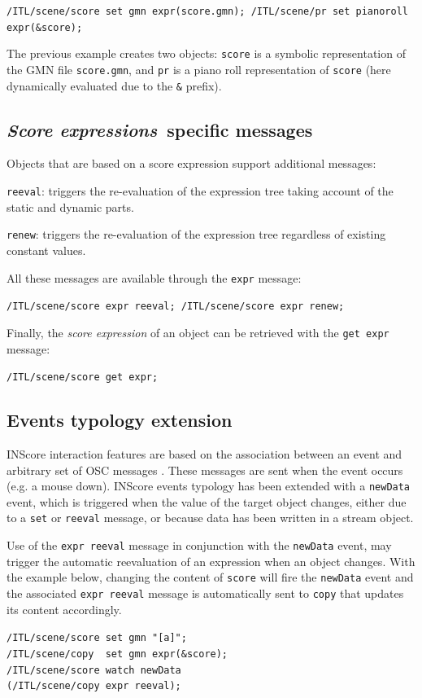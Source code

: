 \documentclass{article}
\newcommand{\OSC}[1]{{\fontsize{9.5pt}{10pt} \selectfont\texttt{#1}}}
\newcommand{\SExpr}{\emph{Score expressions}}
\let\olditemize\itemize
\let\oldenditemize\enditemize
\renewenvironment{itemize} 	{\olditemize \setlength{\itemsep}{1mm}}{\oldenditemize}
\newcommand{\sample}	[1]			{\vspace{-0.2em}\begin{center}\colorbox{mygrey}{\begin{minipage}[t]{0.95\columnwidth} {\small \texttt{#1}}\end{minipage}}\end{center}}
\begin{document}
{\sample{/ITL/scene/score set gmn expr(score.gmn);
/ITL/scene/pr set pianoroll expr(\&score);
}

The previous example creates two objects: \OSC{score} is a symbolic representation of the GMN file \OSC{score.gmn}, and \OSC{pr} is a piano roll representation of \OSC{score} (here dynamically evaluated due to the \OSC{\&} prefix).


\subsection{\SExpr\ specific messages}
\label{exprMsgs}
Objects that are based on a score expression support additional messages:

\begin{itemize}
\item \OSC{reeval}: triggers the re-evaluation of the expression tree taking account of the static and dynamic parts.
\item \OSC{renew}: triggers the re-evaluation of the expression tree regardless of existing constant values. 
\end{itemize}

All these messages are available through the \OSC{expr} message:
\sample{/ITL/scene/score expr reeval;
/ITL/scene/score expr renew;
}

Finally, the  \emph{score expression} of an object can be retrieved with the \OSC{get expr} message:
\sample{/ITL/scene/score get expr;}

\subsection{Events typology extension}
\label{exprEvents}

INScore interaction features are based on the association between an event and arbitrary set of OSC messages \cite{Fober:13b}. These messages are sent when the event occurs (e.g. a mouse down).
INScore events typology has been extended with a \OSC{newData} event, which is triggered when the value of the target object changes, either due to a \OSC{set} or \OSC{reeval} message, or because data has been written in a stream object.

Use of the \OSC{expr reeval} message in conjunction with the \OSC{newData} event, may trigger the automatic reevaluation of an expression when an object changes. With the example below, changing the content of \OSC{score} will fire the \OSC{newData} event and the associated \OSC{expr reeval} message is automatically sent to \OSC{copy} that updates its content accordingly.
\sample{/ITL/scene/score set gmn "[a]";\\
/ITL/scene/copy\ \ set gmn expr(\&score);\\
/ITL/scene/score watch newData\\   
\hspace*{8mm}(/ITL/scene/copy expr reeval);
}

}
\end{document}
